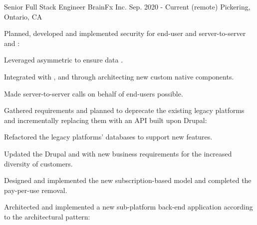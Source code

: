 

\begin{cventries}

  \cventry
  {Senior Full Stack Engineer} %
  {BrainFx Inc.} %
  {Sep. 2020 - Current} %
  {(remote) Pickering, Ontario, CA} %
  {
    \begin{cvitems} %
      \item {Planned, developed and implemented security for end-user and server-to-server  and :}
        \begin{cvsubitems}
          \item {Leveraged asymmetric  to ensure data .}
          \item {Integrated with ,  and  through architecting new custom native components.}
          \item {Made server-to-server calls on behalf of end-users possible.}
        \end{cvsubitems}
      \item {Gathered requirements and planned to deprecate the existing legacy platforms and incrementally replacing them with an API built upon Drupal:}
        \begin{cvsubitems}
          \item {Refactored the legacy platforms' databases to support new features}.
          \item {Updated the Drupal  and  with new business requirements for the increased diversity of customers}.
          \item {Designed and implemented the new subscription-based model and completed the pay-per-use removal}.
        \end{cvsubitems}
      \item {Architected and implemented a new sub-platform back-end application according to the  architectural pattern:}

\end{cvitems}}
\end{cventries}
